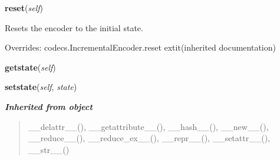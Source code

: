     \vspace{0.5ex}

\hspace{.8\funcindent}\begin{boxedminipage}{\funcwidth}

    \raggedright \textbf{reset}(\textit{self})

\setlength{\parskip}{2ex}
    Resets the encoder to the initial state.

\setlength{\parskip}{1ex}
      Overrides: codecs.IncrementalEncoder.reset 	extit{(inherited documentation)}

    \end{boxedminipage}

    \label{cssutils:codec:IncrementalEncoder:getstate}

    \vspace{0.5ex}

\hspace{.8\funcindent}\begin{boxedminipage}{\funcwidth}

    \raggedright \textbf{getstate}(\textit{self})

\setlength{\parskip}{2ex}
\setlength{\parskip}{1ex}
    \end{boxedminipage}

    \label{cssutils:codec:IncrementalEncoder:setstate}

    \vspace{0.5ex}

\hspace{.8\funcindent}\begin{boxedminipage}{\funcwidth}

    \raggedright \textbf{setstate}(\textit{self}, \textit{state})

\setlength{\parskip}{2ex}
\setlength{\parskip}{1ex}
    \end{boxedminipage}


\large{\textbf{\textit{Inherited from object}}}

\begin{quote}
\_\_delattr\_\_(), \_\_getattribute\_\_(), \_\_hash\_\_(), \_\_new\_\_(), \_\_reduce\_\_(), \_\_reduce\_ex\_\_(), \_\_repr\_\_(), \_\_setattr\_\_(), \_\_str\_\_()
\end{quote}

